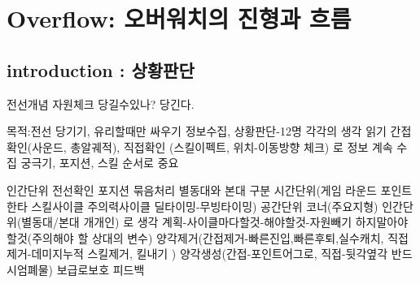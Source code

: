 \chapter{Overflow: 오버워치의 진형과 흐름}{\label{sec:flow}}
\section{introduction : 상황판단}
전선개념 자원체크 당길수있나? 당긴다.


목적:전선 당기기, 유리할때만 싸우기
정보수집, 상황판단-12명 각각의 생각 읽기
간접확인(사운드, 총알궤적), 직접확인 (스킬이펙트, 위치-이동방향 체크) 로 정보 계속 수집
궁극기, 포지션, 스킬 순서로 중요

인간단위 전선확인 포지션 묶음처리 별동대와 본대 구분
시간단위(게임 라운드 포인트 한타 스킬사이클 주의력사이클 딜타이밍-무빙타이밍)  공간단위 코너(주요지형) 인간단위(별동대/본대 개개인) 로 생각
계획-사이클마다할것-해야할것-자원빼기 하지말아야할것(주의해야 할 상대의 변수)
양각제거(간접제거-빠른진입,빠른후퇴,실수캐치, 직접제거-데미지누적 스킬제거, 킬내기 )
양각생성(간접-포인트어그로, 직접-뒷각옆각 반드시엄폐물)
보급로보호
피드백